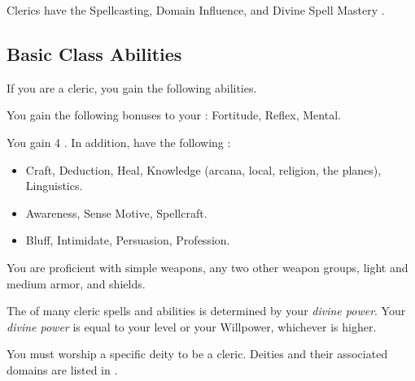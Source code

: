      Clerics have the Spellcasting, Domain Influence, and Divine Spell Mastery .

    \subsection{Basic Class Abilities}
        If you are a cleric, you gain the following abilities.

        You gain the following bonuses to your :  Fortitude,  Reflex,  Mental.

        You gain 4 .
        In addition, have the following :
        \begin{itemize}
            \item {} Craft, Deduction, Heal, Knowledge (arcana, local, religion, the planes), Linguistics.
            \item {} Awareness, Sense Motive, Spellcraft.
            \item {} Bluff, Intimidate, Persuasion, Profession.
        \end{itemize}

        You are proficient with simple weapons, any two other weapon groups, light and medium armor, and shields.

        The  of many cleric spells and abilities is determined by your \textit{divine power}.
        Your \textit{divine power} is equal to your level or your Willpower, whichever is higher.

        You must worship a specific deity to be a cleric.
        Deities and their associated domains are listed in .


